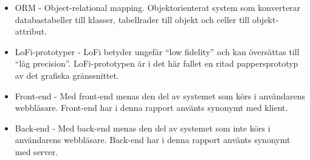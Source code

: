 \begin{itemize}

\iteme GOLI(a)T - Gemensam Operationsprocess, Ledning och IT-stöd. Projekt inom Region Östergötland där man siktar på att standardisera och förenklar operationsprocesser.

\item ORM - Object-relational mapping. Objektorienterat system som konverterar databastabeller till klasser, tabellrader till objekt och celler till objekt-attribut.

\item LoFi-prototyper - LoFi betyder ungefär ``low fidelity'' och kan översättas till ``låg precision''. LoFi-prototypen är i det här fallet en ritad pappersprototyp av det grafiska gränssnittet.

\item Front-end - Med front-end menas den del av systemet som körs i användarens webbläsare. Front-end har i denna rapport använts synonymt med klient.

\item Back-end - Med back-end menas den del av systemet som inte körs i användarens webbläsare. Back-end har i denna rapport använts synonymt med server. 

\end{itemize}

\newpage
